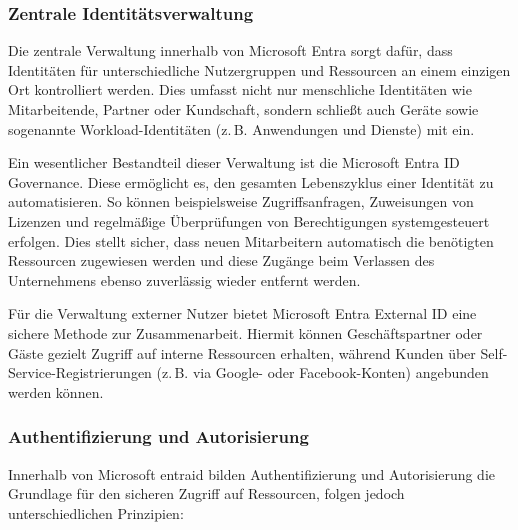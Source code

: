 \subsubsection{Zentrale Identitätsverwaltung}

Die zentrale Verwaltung innerhalb von Microsoft Entra sorgt dafür, dass Identitäten
für unterschiedliche Nutzergruppen und Ressourcen an einem einzigen Ort kontrolliert
werden. Dies umfasst nicht nur menschliche Identitäten wie Mitarbeitende, Partner
oder Kundschaft, sondern schließt auch Geräte sowie sogenannte
Workload-Identitäten (z.\,B. Anwendungen und Dienste) mit ein.
\cite{msentra2025,tsolkas2017rollen}

Ein wesentlicher Bestandteil dieser Verwaltung ist die Microsoft Entra ID
Governance. Diese ermöglicht es, den gesamten Lebenszyklus einer Identität zu
automatisieren. So können beispielsweise Zugriffsanfragen, Zuweisungen von Lizenzen
und regelmäßige Überprüfungen von Berechtigungen systemgesteuert erfolgen. Dies
stellt sicher, dass neuen Mitarbeitern automatisch die benötigten Ressourcen
zugewiesen werden und diese Zugänge beim Verlassen des Unternehmens ebenso
zuverlässig wieder entfernt werden.
\cite{msentra2025,tsolkas2017rollen}

Für die Verwaltung externer Nutzer bietet Microsoft Entra External ID eine sichere
Methode zur Zusammenarbeit. Hiermit können Geschäftspartner oder Gäste gezielt
Zugriff auf interne Ressourcen erhalten, während Kunden über
Self-Service-Registrierungen (z.\,B. via Google- oder Facebook-Konten) angebunden
werden können. \cite{msentra2025}

\subsubsection{Authentifizierung und Autorisierung}

Innerhalb von Microsoft \gls{entraid} bilden Authentifizierung und Autorisierung die
Grundlage für den sicheren Zugriff auf Ressourcen, folgen jedoch unterschiedlichen
Prinzipien:

